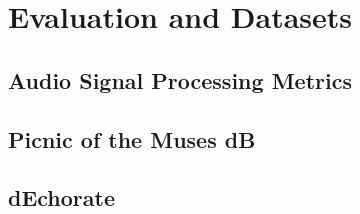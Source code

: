 \chapter{Evaluation and Datasets}\label{chap:evaluation}

\section{Audio Signal Processing Metrics}
\blindtext[3]

\section{Picnic of the Muses dB}
\blindtext[4]

\section{dEchorate}
\blindtext[5]



